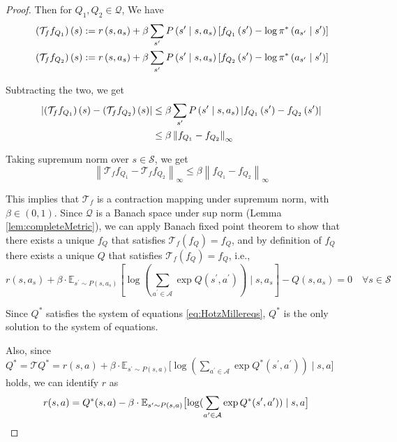 \begin{proof}
Then for $Q_1, Q_2 \in\mathcal{Q}$, We have
\begin{align} & \left(\mathcal{T}_f f_{Q_1}\right)(s):=r\left(s, a_s\right)+\beta \sum_{s^{\prime}} P\left(s^{\prime} \mid s, a_s\right)\left[f_{Q_1}\left(s^{\prime}\right)-\log \pi^*\left(a_{s^{\prime}} \mid s^{\prime}\right)\right] \notag
\\ & \left(\mathcal{T}_f f_{Q_2}\right)(s):=r\left(s, a_s\right)+\beta \sum_{s^{\prime}} P\left(s^{\prime} \mid s, a_s\right)\left[f_{Q_2}\left(s^{\prime}\right)-\log \pi^*\left(a_{s^{\prime}} \mid s^{\prime}\right)\right]\notag
\end{align}

Subtracting the two, we get
\begin{align}
\left|\left(\mathcal{T}_f f_{Q_1}\right)(s)-\left(\mathcal{T}_f f_{Q_2}\right)(s)\right| 
&\leq \beta \sum_{s^{\prime}} P\left(s^{\prime} \mid s, a_s\right)\left|f_{Q_1}\left(s^{\prime}\right)-f_{Q_2}\left(s^{\prime}\right)\right| \notag
\\
&\leq \beta\left\|f_{Q_1}-f_{Q_2}\right\|_{\infty} \notag
\end{align}

Taking supremum norm over $s\in\mathcal{S}$, we get
$$\left\|\mathcal{T}_f f_{Q_1}-\mathcal{T}_f f_{Q_2}\right\|_{\infty} \leq \beta\left\|f_{Q_1}-f_{Q_2}\right\|_\infty$$

This implies that $\mathcal{T}_f$ is a contraction mapping under supremum norm, with $\beta\in (0,1)$. Since $\mathcal{Q}$ is a Banach space under sup norm (Lemma \ref{lem:completeMetric}), we can apply Banach fixed point theorem to show that there exists a unique $f_Q$ that satisfies $\mathcal{T}_f(f_Q) = f_Q$, and by definition of $f_Q$ there exists a unique $Q$ that satisfies $\mathcal{T}_f(f_Q) = f_Q$, i.e., 
$$r\left(s, a_s\right)+\beta \cdot \mathbb{E}_{s^{\prime} \sim P\left(s, a_s\right)}\left[\log \left(\sum_{a^{\prime} \in \mathcal{A}} \exp Q\left(s^{\prime}, a^{\prime}\right)\right) \mid s, a_s\right]-Q\left(s, a_s\right)=0 \quad \forall s \in \mathcal{S}$$

Since $Q^\ast$ satisfies the system of equations \ref{eq:HotzMillereqs}, $Q^\ast$ is the only solution to the system of equations.

Also, since $Q^\ast = \mathcal{T}Q^\ast = r(s,a)+\beta \cdot \mathbb{E}_{s^{\prime} \sim P(s, a)}\bigl[\log(\sum_{a^\prime\in\mathcal{A}}\exp Q^\ast(s^\prime, a^\prime)) \mid s, a\bigr]$ holds, we can identify $r$ as
\begin{align}
    r(s,a) &= Q^\ast(s, a) - \beta \cdot \mathbb{E}_{s^{\prime} \sim P(s, a)}\bigl[\log(\sum_{a^\prime\in\mathcal{A}}\exp Q^\ast(s^\prime, a^\prime)) \mid s, a\bigr] \notag
\end{align}


\end{proof}
